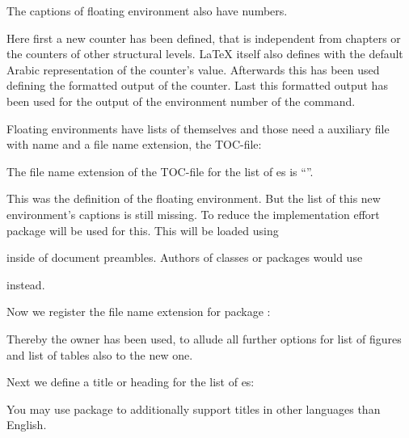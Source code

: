 The captions of floating environment also have numbers.
\begin{lstcode}[belowskip=\dp\strutbox plus 1pt]
  \newcommand*{\remarkboxformat}{%
    Remark~\theremarkbox\csname autodot\endcsname}
  \newcommand*{\fnum@remarkbox}{\remarkboxformat}
\end{lstcode}
Here first a new counter has been defined, that is independent from chapters
or the counters of other structural levels. \LaTeX{} itself also defines
 with the default Arabic representation of the counter's
value. Afterwards this has been used defining the formatted output of the
counter. Last this formatted output has been used for the output of the
environment number of the  command.

Floating environments have lists of themselves
and those need a auxiliary file with name  and a file name
extension, the TOC-file:
\begin{lstcode}[belowskip=\dp\strutbox plus 1pt]
  \newcommand*{\ext@remarkbox}{lor}
\end{lstcode}
The file name extension of the TOC-file for the list of
es is ``''.

This was the definition of the floating environment. But the list of this new
environment's captions is still missing. To reduce the implementation effort
package  will be used for this. This will be loaded using
\begin{lstcode}[belowskip=\dp\strutbox plus 1pt]
  \usepackage{tocbasic}
\end{lstcode}
inside of document preambles. Authors of classes or packages would use
\begin{lstcode}[belowskip=\dp\strutbox plus 1pt]
  \RequirePackage{tocbasic}
\end{lstcode}
instead.

Now we register the file name extension for package
:
\begin{lstcode}[belowskip=\dp\strutbox plus 1pt]
\end{lstcode}
Thereby the owner  has been used, to allude all further
\KOMAScript{} options for list of figures and list of tables also to the new
one.

Next we define a title or heading for the list of
es:
\begin{lstcode}[belowskip=\dp\strutbox plus 1pt]
  \newcommand*{\listoflorname}{List of Remarks}
\end{lstcode}
You may use package  to additionally support titles in other
languages than English.

